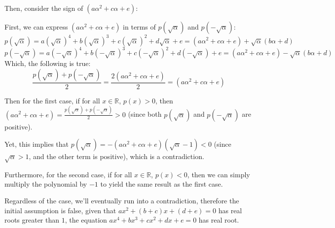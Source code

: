 \documentclass{article}
\begin{document}
\hfill

Then, consider the sign of $(a\alpha^2+c\alpha+e)$:

First, we can express $(a\alpha^2+c\alpha+e)$ in terms of $p(\sqrt{\alpha})$ and $p(-\sqrt{\alpha})$:
$$p(\sqrt{\alpha})=a(\sqrt{\alpha})^4+b(\sqrt{\alpha})^3+c(\sqrt{\alpha})^2+d\sqrt{\alpha}+e = (a\alpha^2+c\alpha+e)+\sqrt{\alpha}(b\alpha+d)$$
$$p(-\sqrt{\alpha})=a(-\sqrt{\alpha})^4+b(-\sqrt{\alpha})^3+c(-\sqrt{\alpha})^2+d(-\sqrt{\alpha})+e = (a\alpha^2+c\alpha+e)-\sqrt{\alpha}(b\alpha+d)$$
Which, the following is true:
$$\frac{p(\sqrt{\alpha})+p(-\sqrt{\alpha})}{2}=\frac{2(a\alpha^2+c\alpha+e)}{2}=(a\alpha^2+c\alpha+e)$$

\hfill

Then for the first case, if for all $x\in\mathbb{R}$, $p(x)>0$, then $(a\alpha^2+c\alpha+e)=\frac{p(\sqrt{\alpha})+p(-\sqrt{\alpha})}{2}>0$ (since both $p(\sqrt{\alpha})$ and $p(-\sqrt{\alpha})$ are positive).

Yet, this implies that $p(\sqrt{\alpha})=-(a\alpha^2+c\alpha+e)(\sqrt{\alpha}-1)<0$ (since $\sqrt{\alpha}>1$, and the other term is positive), which is a contradiction.

\hfill

Furthermore, for the second case, if for all $x\in\mathbb{R}$, $p(x)<0$, then we can simply multiply the polynomial by $-1$ to yield the same result as the first case.

\hfill

Regardless of the case, we'll eventually run into a contradiction, therefore the initial assumption is false, given that $ax^2+(b+c)x+(d+e)=0$ has real roots greater than $1$, the equation $ax^4+bx^3+cx^2+dx+e=0$ has real root.
\end{document}
